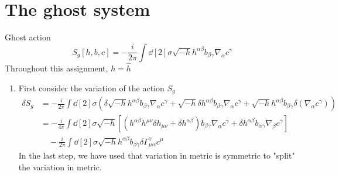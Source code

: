 \section{The ghost system}
Ghost action
\begin{equation}
	S_g[h, b,c] = - \frac{i}{2\pi} \int \dd[2]{\sigma} \sqrt{-h} h^{\alpha \beta} b_{\beta \gamma} \nabla_\alpha c^\gamma
\end{equation}
Throughout this assignment, $h=\hat{h}$
\begin{enumerate}[label=(\alph*)]
	\item First consider the variation of the action $S_g$
		\begin{align*}
			\delta S_g &= - \frac{i}{2\pi} \int \dd[2]{\sigma} \left( \delta\sqrt{-h} h^{\alpha\beta} b_{\beta\gamma} \nabla_\alpha c^\gamma + \sqrt{-h} \delta h^{\alpha \beta} b_{\beta \gamma} \nabla_\alpha c^\gamma +\sqrt{-h} h^{\alpha \beta} b_{\beta \gamma} \delta(\nabla_\alpha c^\gamma) \right) \\
						  &= - \frac{i}{4\pi} \int \dd[2]{\sigma} \sqrt{-h} \left[ \left( h^{\alpha\beta} h^{\mu\nu} \delta h_{\mu\nu} + \delta h^{\alpha\beta}\right) b_{\beta\gamma} \nabla_\alpha c^\gamma + \delta h^{\alpha \beta} b_{\alpha\gamma} \nabla_\beta c^\gamma \right] \\
						  &\quad - \frac{i}{2\pi} \int \dd[2]{\sigma} \sqrt{-h} h^{\alpha \beta} b_{\beta \gamma} \delta \Gamma^\gamma_{\mu \alpha} c^\mu
		\end{align*}
		In the last step, we have used that variation in metric is symmetric to "split" the variation in metric.


\end{enumerate}
